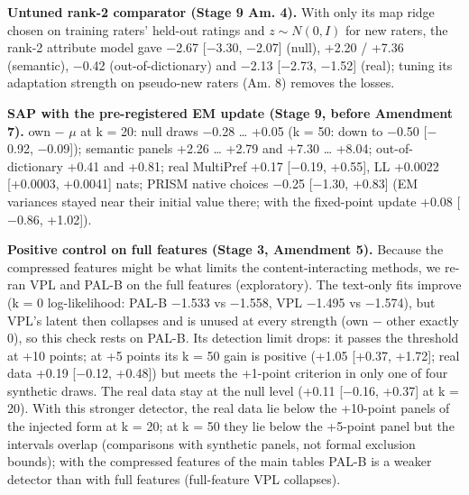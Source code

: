 \documentclass{article}
\begin{document}
\textbf{Untuned rank-2 comparator (Stage 9 Am. 4).} With only its map ridge chosen on training raters' held-out ratings and \(z \sim N(0, I)\) for new raters, the rank-2 attribute model gave $-$2.67 {[}$-$3.30, $-$2.07{]} (null), +2.20 / +7.36 (semantic), $-$0.42 (out-of-dictionary) and $-$2.13 {[}$-$2.73, $-$1.52{]} (real); tuning its adaptation strength on pseudo-new raters (Am. 8) removes the losses.

\textbf{SAP with the pre-registered EM update (Stage 9, before Amendment 7).} own $-$ $\mu$ at k = 20: null draws $-$0.28 \ldots{} +0.05 (k = 50: down to $-$0.50 {[}$-$0.92, $-$0.09{]}); semantic panels +2.26 \ldots{} +2.79 and +7.30 \ldots{} +8.04; out-of-dictionary +0.41 and +0.81; real MultiPref +0.17 {[}$-$0.19, +0.55{]}, LL +0.0022 {[}+0.0003, +0.0041{]} nats; PRISM native choices $-$0.25 {[}$-$1.30, +0.83{]} (EM variances stayed near their initial value there; with the fixed-point update +0.08 {[}$-$0.86, +1.02{]}).

\textbf{Positive control on full features (Stage 3, Amendment 5).} Because the compressed features might be what limits the content-interacting methods, we re-ran VPL and PAL-B on the full features (exploratory). The text-only fits improve (k = 0 log-likelihood: PAL-B $-$1.533 vs $-$1.558, VPL $-$1.495 vs $-$1.574), but VPL's latent then collapses and is unused at every strength (own $-$ other exactly 0), so this check rests on PAL-B. Its detection limit drops: it passes the threshold at +10 points; at +5 points its k = 50 gain is positive (+1.05 {[}+0.37, +1.72{]}; real data +0.19 {[}$-$0.12, +0.48{]}) but meets the +1-point criterion in only one of four synthetic draws. The real data stay at the null level (+0.11 {[}$-$0.16, +0.37{]} at k = 20). With this stronger detector, the real data lie below the +10-point panels of the injected form at k = 20; at k = 50 they lie below the +5-point panel but the intervals overlap (comparisons with synthetic panels, not formal exclusion bounds); with the compressed features of the main tables PAL-B is a weaker detector than with full features (full-feature VPL collapses).
\end{document}
